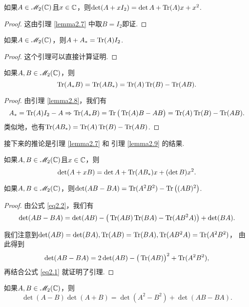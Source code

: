 \begin{corollary}
  如果$A\in\mathscr M_2(\mathbb C)$且$x\in\mathbb C$，则$\det (A+xI_2)=\det A+\operatorname{Tr}(A)x+x^2$.
\end{corollary}

\begin{proof}
  这由引理 \ref{lemma2.7} 中取$B=I_2$即证.
\end{proof}

\begin{lemma}
  如果$A\in\mathscr M_2(\mathbb C)$，则$A+A_\ast=\operatorname{Tr}(A)I_2$.
\end{lemma}

\begin{proof}
  这个引理可以直接计算证明.
\end{proof}

\begin{lemma}
  如果$A,B\in\mathscr M_2(\mathbb C)$，则
  \[
    \operatorname{Tr}(A_\ast B) = \operatorname{Tr}(AB_\ast) = \operatorname{Tr}(A)\operatorname{Tr}(B) - \operatorname{Tr}(AB).
  \]
\end{lemma}

\begin{proof}
  由引理 \ref{lemma2.8}，我们有
  \[
    A_\ast = \operatorname{Tr}(A)I_2 - A \Rightarrow
    \operatorname{Tr}(A_\ast B) = \operatorname{Tr}\big( \operatorname{Tr}(A)B - AB \big)
    = \operatorname{Tr}(A)\operatorname{Tr}(B) - \operatorname{Tr}(AB).
  \]
  类似地，也有$\operatorname{Tr}(AB_\ast) = \operatorname{Tr}(A)\operatorname{Tr}(B)-\operatorname{Tr}(AB)$.
\end{proof}

接下来的推论是引理 \ref{lemma2.7} 和 引理 \ref{lemma2.9} 的结果.

\begin{corollary}
  如果$A,B\in\mathscr M_2(\mathbb C)$且$x\in\mathbb C$，则
  \[
    \det (A + xB) = \det A + \operatorname{Tr}(AB_\ast)x + (\det B)x^2.
  \]
\end{corollary}

\begin{lemma}
  如果$A,B\in\mathscr M_2(\mathbb C)$，则$\det(AB-BA)=\operatorname{Tr}(A^2B^2)
  -\operatorname{Tr}\big((AB)^2\big) $.
\end{lemma}

\begin{proof}
  由公式 \eqref{eq2.2}，我们有
  \[
    \det (AB - BA) = \det (AB) - \big( \operatorname{Tr}(AB)\operatorname{Tr}(BA) - \operatorname{Tr}(AB^2A) \big) + \det (BA).
  \]

  我们注意到$\det(AB)=\det(BA),\operatorname{Tr}(AB)=\operatorname{Tr}(BA),
  \operatorname{Tr}(AB^2A)=\operatorname{Tr}(A^2B^2) $， 由此得到
  \[
    \det (AB - BA) = 2\det (AB) - \big(\operatorname{Tr}(AB)\big)^2 + \operatorname{Tr}(A^2B^2),
  \]
  再结合公式 \eqref{eq2.1} 就证明了引理.
\end{proof}

\begin{lemma}
  如果$A,B\in\mathscr M_2(\mathbb C)$，则
  \[
    \det (A - B) \det (A + B) = \det (A^2 - B^2) + \det (AB - BA).
  \]
\end{lemma}

